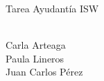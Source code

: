 \documentclass[10pt,a4paper]{report}
\begin{document}
\begin{center}
\begin{huge}
\centering
Tarea Ayudant\'ia ISW\\\
\end{huge}

Carla Arteaga\\
Paula Lineros\\
Juan Carlos P\'erez
\end{center}







\end{document}
